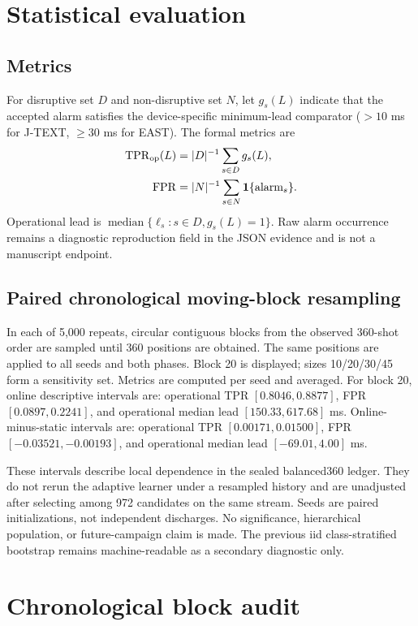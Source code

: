 \documentclass[10pt]{article}
\newcommand{\jtext}{J-TEXT}
\newcommand{\east}{EAST}
\newcommand{\tpr}{\mathrm{TPR}}
\newcommand{\fpr}{\mathrm{FPR}}
\begin{document}
\section{Statistical evaluation}

\subsection{Metrics}

For disruptive set $D$ and non-disruptive set $N$, let $g_s(L)$ indicate that the accepted alarm satisfies the device-specific minimum-lead comparator ($>10$ ms for \jtext{}, $\geq30$ ms for \east{}).  The formal metrics are
\begin{align}
\tpr_{\rm op}(L) &= |D|^{-1}\sum_{s\in D}g_s(L),\\
\fpr &= |N|^{-1}\sum_{s\in N}\mathbf{1}\{\text{alarm}_s\}.
\end{align}
Operational lead is $\operatorname{median}\{\ell_s:s\in D,g_s(L)=1\}$.  Raw alarm occurrence remains a diagnostic reproduction field in the JSON evidence and is not a manuscript endpoint.

\subsection{Paired chronological moving-block resampling}

In each of 5,000 repeats, circular contiguous blocks from the observed 360-shot order are sampled until 360 positions are obtained.  The same positions are applied to all seeds and both phases.  Block 20 is displayed; sizes 10/20/30/45 form a sensitivity set.  Metrics are computed per seed and averaged.  For block 20, online descriptive intervals are: operational TPR $[0.8046,0.8877]$, FPR $[0.0897,0.2241]$, and operational median lead $[150.33,617.68]$ ms.  Online-minus-static intervals are: operational TPR $[0.00171,0.01500]$, FPR $[-0.03521,-0.00193]$, and operational median lead $[-69.01,4.00]$ ms.

These intervals describe local dependence in the sealed balanced360 ledger.  They do not rerun the adaptive learner under a resampled history and are unadjusted after selecting among 972 candidates on the same stream.  Seeds are paired initializations, not independent discharges.  No significance, hierarchical population, or future-campaign claim is made.  The previous iid class-stratified bootstrap remains machine-readable as a secondary diagnostic only.

\section{Chronological block audit}
\end{document}
